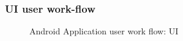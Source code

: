 \newpage
\subsubsection{UI user work-flow}
\begin{figure}[H]
\centering	
{}
\caption{Android Application user work flow: UI}
\end{figure}

